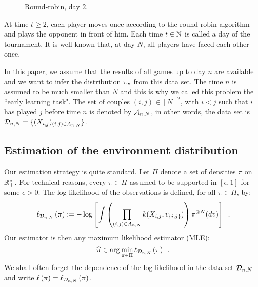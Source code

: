 \begin{figure}
\centering
{}
\caption{Round-robin, day $2$.}
\label{fig:robin:day2}
\end{figure}

At time $t\ge 2$, each player moves once according to the round-robin algorithm and plays the opponent in front of him. Each time $t\in\mathbb{N}$ is called a day of the tournament. It is well known that, at day $N$, all players have faced each other once. 

In this paper, we assume that the results of all games up to day $n$ are available and we want to infer the distribution $\pi_{\star}$ from this data set. The time $n$ is assumed to be much smaller than $N$ and this is why we called this problem the ``early learning task". The set of couples $(i,j)\in[N]^2$, with $i<j$ such that $i$ has played $j$ before time $n$ is denoted by $\mathcal{A}_{n,N}$, in other words, the data set is $\mathcal{D}_{n,N}=\{(X_{i,j})_{(i,j)\in A_{n,N}}\}$.


\subsection{Estimation of the environment distribution}
Our estimation strategy is quite standard. Let $\Pi$ denote a set of densities $\pi$ on $\mathbb{R}_+^*$. For technical reasons, every $\pi\in\Pi$ assumed to be supported in $[\epsilon,1]$ for some $\epsilon>0$. The log-likelihood of the observations is defined, for all $\pi\in\Pi$, by:
\[
\ell_{\mathcal{D}_{n,N}}\left(\pi\right):=-\log\left[\int  \left(\prod_{(i,j)\in A_{n,N}}k(X_{i,j},v_{\{i,j\}})\right)\pi^{\otimes N}(dv)\right]\enspace.
\]
Our estimator is then any maximum likelihood estimator (MLE):
\[
\widehat{\pi}\in \arg\min_{\pi\in\Pi}\ell_{\mathcal{D}_{n,N}}\left(\pi\right)\enspace.
\]
We shall often forget the dependence of the log-likelihood in the data set $\mathcal{D}_{n,N}$ and write $\ell\left(\pi\right)=\ell_{\mathcal{D}_{n,N}}\left(\pi\right)$.


